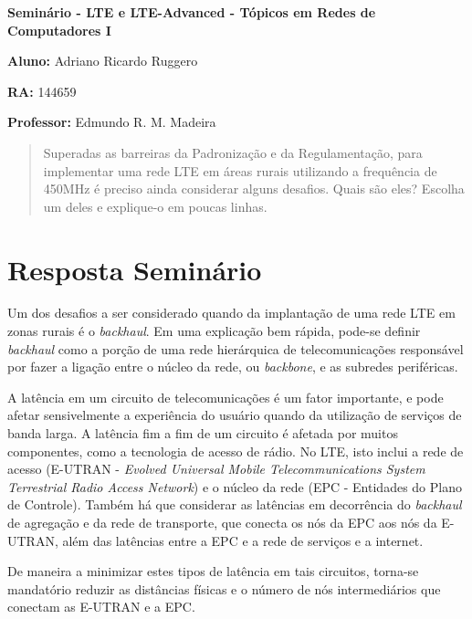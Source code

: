 \documentclass[12pt,twoside,a4paper]{article}
\begin{document}
\vskip 15mm

\begin{center} 
\textbf{Seminário  - LTE e LTE-Advanced - Tópicos em Redes de Computadores I}

\end{center}

\vskip 5mm

\textbf{Aluno:} Adriano Ricardo Ruggero

\textbf{RA:} 144659

\textbf{Professor:} Edmundo R. M. Madeira

\vskip 20mm

\begin{abstract}

Superadas as barreiras da Padronização e da Regulamentação, para implementar uma rede LTE em áreas rurais utilizando a frequência de 450MHz é preciso ainda considerar alguns desafios. Quais são eles? Escolha um deles e explique-o em poucas linhas.

\end{abstract}

\newpage
\pagestyle{plain}
\headheight 0.0cm
\headsep 0.0cm
\footskip 2.2cm

\section{Resposta Seminário}
\label{sec:01}

Um dos desafios a ser considerado quando da implantação de uma rede LTE em zonas rurais é o \textit{backhaul}. Em uma explicação bem rápida, pode-se definir \textit{backhaul} como a porção de uma rede hierárquica de telecomunicações responsável por fazer a ligação entre o núcleo da rede, ou \textit{backbone}, e as subredes periféricas\cite{Backhaul}.

A latência em um circuito de telecomunicações é um fator importante, e pode afetar sensivelmente a experiência do usuário quando da utilização de serviços de banda larga. A latência fim a fim de um circuito é afetada por muitos componentes, como a tecnologia de acesso de rádio. No LTE, isto inclui a rede de acesso (E-UTRAN - \textit{Evolved Universal Mobile Telecommunications System Terrestrial Radio Access Network\cite{EUTRAN}}) e o núcleo da rede (EPC - Entidades do Plano de Controle). Também há que considerar as latências em decorrência do \textit{backhaul} de agregação e da rede de transporte, que conecta os nós da EPC aos nós da E-UTRAN, além das latências entre a EPC e a rede de serviços e a internet.

De maneira a minimizar estes tipos de latência em tais circuitos, torna-se mandatório reduzir as distâncias físicas e o número de nós  intermediários que conectam as E-UTRAN e a EPC\cite{LTE_Rural}.



\end{document}
